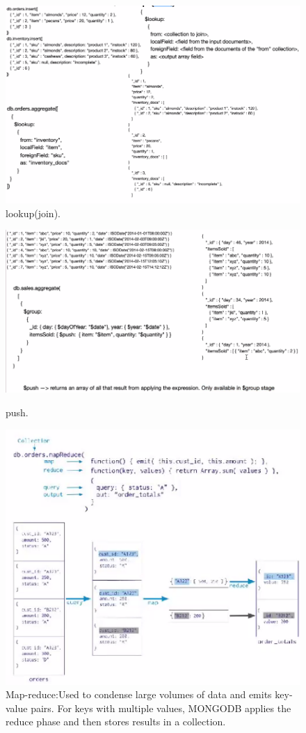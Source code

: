\documentclass{article}
\begin{document}
\begin{figure}[h!]
\includegraphics[scale=0.7]{15.png}
\caption{lookup(join).}
\end{figure}
\begin{figure}[h!]
\includegraphics[scale=0.7]{16.png}
\caption{push.}
\includegraphics[scale=0.7]{17.png}
\caption{Map-reduce:Used to condense large volumes of data and emits key-value pairs. For keys with multiple values, MONGODB applies the reduce phase and then stores results in a collection.}
\end{figure}
\newpage
\end{document}

